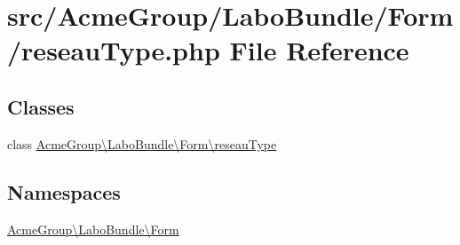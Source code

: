 \hypertarget{reseau_type_8php}{\section{src/\+Acme\+Group/\+Labo\+Bundle/\+Form/reseau\+Type.php File Reference}
\label{reseau_type_8php}
}
\subsection*{Classes}
\begin{DoxyCompactItemize}
\item 
class \hyperlink{class_acme_group_1_1_labo_bundle_1_1_form_1_1reseau_type}{Acme\+Group\textbackslash{}\+Labo\+Bundle\textbackslash{}\+Form\textbackslash{}reseau\+Type}
\end{DoxyCompactItemize}
\subsection*{Namespaces}
\begin{DoxyCompactItemize}
\item 
 \hyperlink{namespace_acme_group_1_1_labo_bundle_1_1_form}{Acme\+Group\textbackslash{}\+Labo\+Bundle\textbackslash{}\+Form}
\end{DoxyCompactItemize}
